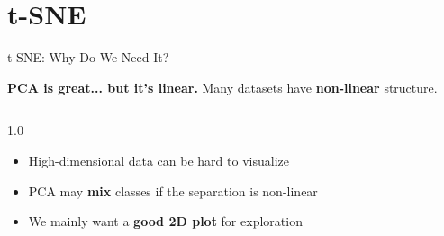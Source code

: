 \section{t-SNE}
\begin{frame}{t-SNE: Why Do We Need It?}

\textbf{PCA is great... but it's linear.} Many datasets have \textbf{non-linear} structure.

\vspace{0.8em}
\begin{columns}[c]
\begin{column}{1.0\textwidth}
\begin{tcolorbox}[colback=blue!5, colframe=blue!50, title=\textbf{Problem}]
\begin{itemize}
\item High-dimensional data can be hard to visualize
\item PCA may \textbf{mix} classes if the separation is non-linear
\item We mainly want a \textbf{good 2D plot} for exploration
\end{itemize}
\end{tcolorbox}
\end{column}
\end{columns}

\end{frame}


